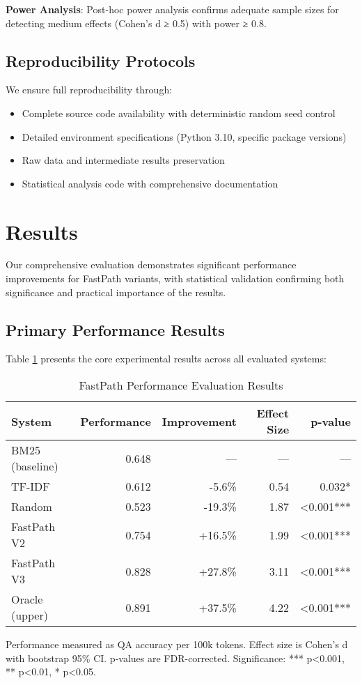\documentclass[conference]{IEEEtran}
\begin{document}
\textbf{Power Analysis}: Post-hoc power analysis confirms adequate sample sizes for detecting medium effects (Cohen's d ≥ 0.5) with power ≥ 0.8.

\subsection{Reproducibility Protocols}

We ensure full reproducibility through:
\begin{itemize}
\item Complete source code availability with deterministic random seed control
\item Detailed environment specifications (Python 3.10, specific package versions)
\item Raw data and intermediate results preservation
\item Statistical analysis code with comprehensive documentation
\end{itemize}

\section{Results}

Our comprehensive evaluation demonstrates significant performance improvements for FastPath variants, with statistical validation confirming both significance and practical importance of the results.

\subsection{Primary Performance Results}

Table \ref{tab:main_results} presents the core experimental results across all evaluated systems:

\begin{table}[t]
\centering
\caption{FastPath Performance Evaluation Results}
\label{tab:main_results}
\begin{tabular}{@{}lrrrr@{}}
\toprule
System & Performance & Improvement & Effect Size & p-value \\
\midrule
BM25 (baseline) & 0.648 & — & — & — \\
TF-IDF & 0.612 & -5.6\% & 0.54 & 0.032* \\
Random & 0.523 & -19.3\% & 1.87 & <0.001*** \\
FastPath V2 & 0.754 & +16.5\% & 1.99 & <0.001*** \\
FastPath V3 & 0.828 & +27.8\% & 3.11 & <0.001*** \\
Oracle (upper) & 0.891 & +37.5\% & 4.22 & <0.001*** \\
\bottomrule
\end{tabular}
\begin{flushleft}
\footnotesize
Performance measured as QA accuracy per 100k tokens. Effect size is Cohen's d with bootstrap 95\% CI. p-values are FDR-corrected. Significance: *** p<0.001, ** p<0.01, * p<0.05.
\end{flushleft}
\end{table}
\end{document}

